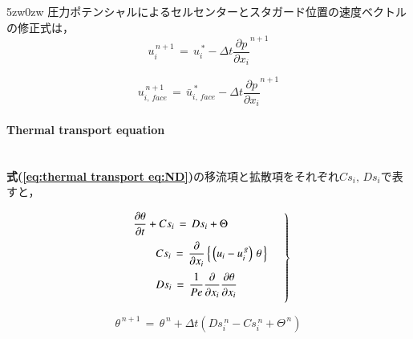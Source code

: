 \begin{indentation}{5zw}{0zw}
\noindent 圧力ポテンシャルによるセルセンターとスタガード位置の速度ベクトルの修正式は，
\begin{equation}
u_i^{\,n+1} \,=\, u_i^{\,*} - \Delta t {\frac{\partial p}{\partial x_i}}^{n+1}
\label{eq:Pressure correction CC}
\end{equation}

\begin{equation}
u_{i,\,face}^{\,n+1} \,=\, \bar{u}_{i,\,face}^{\,*} - \Delta t {\frac{\partial p}{\partial x_i}}^{n+1}
\label{eq:Pressure correction CF}
\end{equation}

\paragraph{Thermal transport equation} $\mbox{}$\\
\textbf{式(\ref{eq:thermal transport eq:ND})}の移流項と拡散項をそれぞれ$Cs_i,\,Ds_i$で表すと，

\begin{equation}
\left.
\begin{array}{l} 
\vspace{2mm}
\displaystyle { \frac{\partial \theta}{\partial t} + Cs_i \,=\, Ds_i + \Theta } \\
\vspace{2mm}
\qquad \displaystyle{ Cs_i \,=\, \frac{\partial}{\partial x_i} \left\{ \, \left( u_i - u_i^{\,g} \right) \, \theta \, \right\} } \\
\vspace{2mm}
\qquad \displaystyle{ Ds_i \,=\, \frac{1}{Pe}\frac{\partial}{\partial x_i} \frac{\partial \theta}{\partial x_i} } \\
\end{array} \quad \right \}
\label{eq:thermal transport eqs}
\end{equation}

\begin{equation}
\theta^{\,n+1} \,=\, \theta^{\,n} + \Delta t \left( Ds_i^{\,n} - Cs_i^{\,n} + \Theta^{\,n} \right)
\label{eq:thermal transport EE}
\end{equation}

\end{indentation}

%
